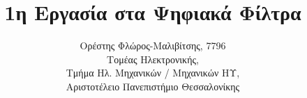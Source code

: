 \usepackage[Greek,Latin]{ucharclasses}

\usepackage{polyglossia}
\setmainlanguage{greek}

\usepackage{fontspec,unicode-math}
\setmainfont[Mapping=tex-text]{DejaVu Sans}
\newfontfamily{}
\newfontfamily{}
\setmonofont[Scale=1.0]{Source Code Pro Medium}
\newfontfamily{}
\usepackage{microtype} %

\newcommand{\imageref}[1] {%
\hyperref[fig:#1]{Σχήμα \ref{fig:#1}}}
\newcommand{\imagerefc}[2] {%
\hyperref[fig:#1]{#2}}

\newcommand{\imagehere}[2]{%
\begin{figure}[H]%
\centering%
\texttt{[image: images/\#1]}%
\caption{#2}
\label{fig:#1}%
\end{figure}%
}

\title{1η Εργασία στα Ψηφιακά Φίλτρα}
\author{Ορέστης Φλώρος-Μαλιβίτσης, 7796\\
Τομέας Ηλεκτρονικής,\\
Τμήμα Ηλ. Μηχανικών / Μηχανικών ΗΥ,\\
Αριστοτέλειο Πανεπιστήμιο Θεσσαλονίκης}

\setcounter{section}{-1} %

\maketitle
\tableofcontents\newpage






